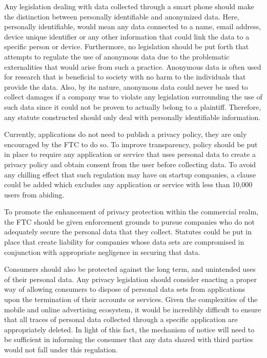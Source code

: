 Any legislation dealing with data collected through a smart phone should make the distinction between personally identifiable and anonymized data. Here, personally identifiable, would mean any data connected to a name, email address, device unique identifier or any other information that could link the data to a specific person or device. Furthermore, no legislation should be put forth that attempts to regulate the use of anonymous data due to the problematic externalities that would arise from such a practice. Anonymous data is often used for research that is beneficial to society with no harm to the individuals that provide the data\cite{unlock}. Also, by its nature, anonymous data could never be used to collect damages if a company was to violate any legislation surrounding the use of such data since it could not be proven to actually belong to a plaintiff. Therefore, any statute constructed should only deal with personally identifiable information. 

Currently, applications do not need to publish a privacy policy, they are only encouraged by the FTC to do so. To improve transparency, policy should be put in place to require any application or service that uses personal data to create a privacy policy and obtain consent from the user before collecting data. To avoid any chilling effect that such regulation may have on startup companies, a clause could be added which excludes any application or service with less than 10,000 users from abiding. 

To promote the enhancement of privacy protection within the commercial realm, the FTC should be given enforcement grounds to pursue companies who do not adequately secure the personal data that they collect. Statutes could be put in place that create liability for companies whose data sets are compromised in conjunction with appropriate negligence in securing that data. 

Consumers should also be protected against the long term, and unintended uses of their personal data. Any privacy legislation should consider enacting a proper way of allowing consumers to dispose of personal data sets from applications upon the termination of their accounts or services. Given the complexities of the mobile and online advertising ecosystem, it would be incredibly difficult to ensure that all traces of personal data collected through a specific application are appropriately deleted. In light of this fact, the mechanism of notice will need to be sufficient in informing the consumer that any data shared with third parties would not fall under this regulation. 


